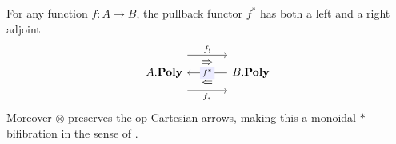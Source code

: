 \documentclass[DynamicalBook]{subfiles}
\begin{document}
\begin{theorem}
For any function $f\colon A\to B$, the pullback functor $f^*$ has both a left and a right adjoint
\begin{equation}\label{eqn.adjoint_triple_monoidal_fib}
\begin{tikzcd}[column sep=large, background color=theoremcolor]
	\poly[A.]\ar[r, shift left=16pt, "f_!"]\ar[r, shift right=16pt, "f_*"']
	\ar[r, phantom, shift left=9pt, "\Rightarrow"]\ar[r, phantom, shift right=9pt, "\Leftarrow"]
&
	\poly[B.]\ar[l, "f^*" description]
\end{tikzcd}
\end{equation}
Moreover $\otimes$ preserves the op-Cartesian arrows, making this a monoidal $*$-bifibration in the sense of \cite[Definition 12.1]{shulman2008framed}.
\end{theorem}
\end{document}
